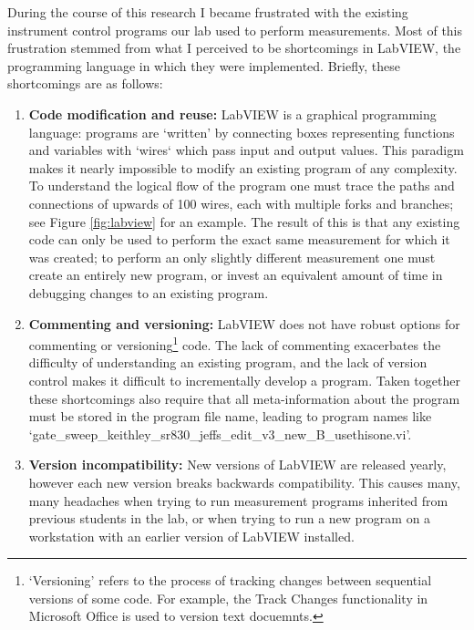 \documentclass[edeposit,fullpage,draftthesis]{uiucthesis2009}
\begin{document}
\begin{appendices}
During the course of this research I became frustrated with the existing instrument control programs
our lab used to perform measurements.
Most of this frustration stemmed from what I perceived to be shortcomings in LabVIEW, the programming
language in which they were implemented. Briefly, these shortcomings are as follows:

    \begin{enumerate}
        \item \textbf{Code modification and reuse:} LabVIEW is a graphical programming language: 
            programs are `written' by connecting boxes representing functions and variables with `wires` which
            pass input and output values. This paradigm makes it nearly impossible to modify
            an existing program of any complexity. To understand the logical flow of the program
            one must trace the paths and connections of upwards of 100 wires, each with multiple forks
            and branches; see Figure \ref{fig:labview} for an example. 
            The result of this is that any existing code can only be used to
            perform the exact same measurement for which it was created; to perform an only slightly 
            different measurement one must create an entirely new program, or invest an equivalent 
            amount of time in debugging changes to an existing program.
        \item \textbf{Commenting and versioning:} LabVIEW does not have robust options for commenting
            or versioning\footnote{`Versioning' refers to the process of tracking changes
            between sequential versions of some code. For example, the Track Changes functionality in Microsoft
            Office is used to version text docuemnts.} code. The lack of commenting exacerbates the difficulty of understanding
            an existing program, and the lack of version control makes it difficult to incrementally
            develop a program. Taken together these shortcomings also require that all meta-information about the
            program must be stored in the program file name, leading to program names like 
            `gate\_sweep\_keithley\_sr830\_jeffs\_edit\_v3\_new\_B\_usethisone.vi'.
        \item \textbf{Version incompatibility:} New versions of LabVIEW are released 
            yearly, however each new version breaks backwards compatibility.
            This causes many, many headaches when trying to run measurement programs inherited
            from previous students in the lab, or when trying to run a new program on a workstation
            with an earlier version of LabVIEW installed.
    \end{enumerate}
        

\end{appendices}
\end{document}
